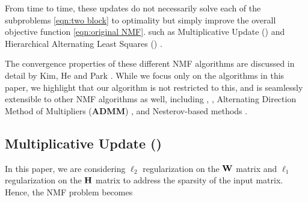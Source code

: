From time to time, these updates do not necessarily solve each of the subproblems \eqref{eqn:two block} to optimality but simply improve the overall objective function \eqref{eqn:original NMF}.  
such as Multiplicative Update (\MU) \cite{seung2001algorithms} and Hierarchical Alternating Least Squares (\HALS) \cite{cichocki2009nonnegative}.

The convergence properties of these different NMF algorithms are discussed in detail by Kim, He and Park \cite{kim2013nonnegative}.
While we focus only on the \MU algorithms in this paper, we highlight that our algorithm is not restricted to this, and is seamlessly extensible to other NMF algorithms as well, including \HALS, \BPP, Alternating Direction Method of Multipliers (\textbf{ADMM}) \cite{SF14}, and Nesterov-based methods \cite{GTLY12}. 





\subsection{Multiplicative Update (\MU)}
\label{sec:sparsenmfmu}

In this paper, we are considering $\ell_2$ regularization on the $\mathbf{W}$ matrix and $\ell_1$ regularization on the $\mathbf{H}$ matrix to address the sparsity of the input matrix. Hence, the NMF problem becomes

